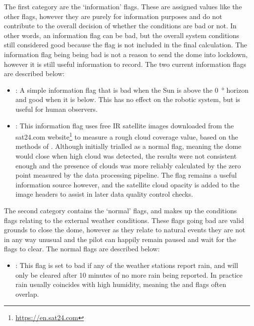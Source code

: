 \begin{colsection}
\clearpage

The first category are the `information' flags. These are assigned values like the other flags, however they are purely for information purposes and do not contribute to the overall decision of whether the conditions are bad or not. In other words, an information flag can be bad, but the overall system conditions still considered good because the flag is not included in the final calculation. The information flag being being bad is not a reason to send the dome into lockdown, however it is still useful information to record. The two current information flags are described below:

\begin{itemize}
    \item {}: A simple information flag that is bad when the Sun is above the \SI{0}{\degree} horizon and good when it is below. This has no effect on the robotic system, but is useful for human observers.

    \item {}: This information flag uses free IR satellite images downloaded from the sat24.com website\footnote{\url{https://en.sat24.com}} to measure a rough cloud coverage value, based on the methods of \citet{clouds}. Although initially trialled as a normal flag, meaning the dome would close when high cloud was detected, the results were not consistent enough and the presence of clouds was more reliably calculated by the zero point measured by the data processing pipeline. The flag remains a useful information source however, and the satellite cloud opacity is added to the image headers to assist in later data quality control checks.
\end{itemize}

The second category contains the `normal' flags, and makes up the conditions flags relating to the external weather conditions. These flags going bad are valid grounds to close the dome, however as they relate to natural events they are not in any way unusual and the pilot can happily remain paused and wait for the flags to clear. The normal flags are described below:

\begin{itemize}
    \item {}: This flag is set to bad if any of the weather stations report rain, and will only be cleared after 10 minutes of no more rain being reported. In practice rain usually coincides with high humidity, meaning the  and  flags often overlap.


\end{itemize}
\end{colsection}
